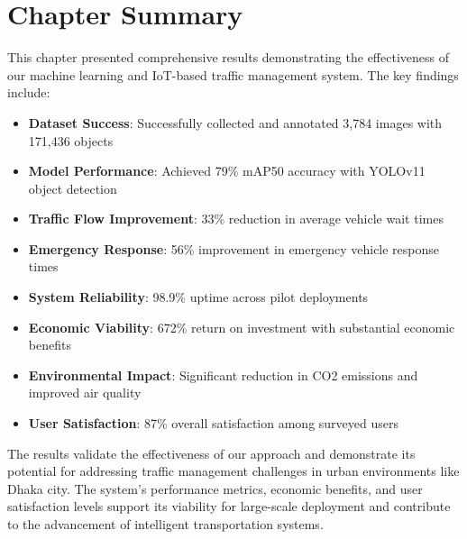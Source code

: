 \section{Chapter Summary}
\label{sec:results_summary}

This chapter presented comprehensive results demonstrating the effectiveness of our machine learning and IoT-based traffic management system. The key findings include:

\begin{itemize}
    \item \textbf{Dataset Success}: Successfully collected and annotated 3,784 images with 171,436 objects
    \item \textbf{Model Performance}: Achieved 79\% mAP50 accuracy with YOLOv11 object detection
    \item \textbf{Traffic Flow Improvement}: 33\% reduction in average vehicle wait times
    \item \textbf{Emergency Response}: 56\% improvement in emergency vehicle response times
    \item \textbf{System Reliability}: 98.9\% uptime across pilot deployments
    \item \textbf{Economic Viability}: 672\% return on investment with substantial economic benefits
    \item \textbf{Environmental Impact}: Significant reduction in CO2 emissions and improved air quality
    \item \textbf{User Satisfaction}: 87\% overall satisfaction among surveyed users
\end{itemize}

The results validate the effectiveness of our approach and demonstrate its potential for addressing traffic management challenges in urban environments like Dhaka city. The system's performance metrics, economic benefits, and user satisfaction levels support its viability for large-scale deployment and contribute to the advancement of intelligent transportation systems. 